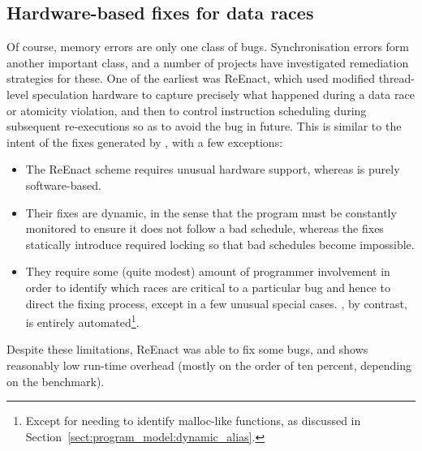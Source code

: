 
\subsection{Hardware-based fixes for data races}
Of course, memory errors are only one class of bugs.  Synchronisation
errors form another important class, and a number of projects have
investigated remediation strategies for these.  One of the earliest
was ReEnact\cite{Prvulovic2003a}, which used modified thread-level
speculation hardware to capture precisely what happened during a data
race or atomicity violation, and then to control instruction
scheduling during subsequent re-executions so as to avoid the bug in
future.  This is similar to the intent of the fixes generated by
{\technique}, with a few exceptions:

\begin{itemize}
\item The ReEnact scheme requires unusual hardware support, whereas
  {\technique} is purely software-based.
\item Their fixes are dynamic, in the sense that the program must be
  constantly monitored to ensure it does not follow a bad schedule,
  whereas the {\technique} fixes statically introduce required locking
  so that bad schedules become impossible.
\item They require some (quite modest) amount of programmer
  involvement in order to identify which races are critical to a
  particular bug and hence to direct the fixing process, except in a
  few unusual special cases.  {\Implementation}, by contrast, is
  entirely automated\footnote{Except for needing to identify
    malloc-like functions, as discussed in
    Section~\ref{sect:program_model:dynamic_alias}.}.
\end{itemize}

Despite these limitations, ReEnact was able to fix some bugs, and
shows reasonably low run-time overhead (mostly on the order of ten
percent, depending on the benchmark).

